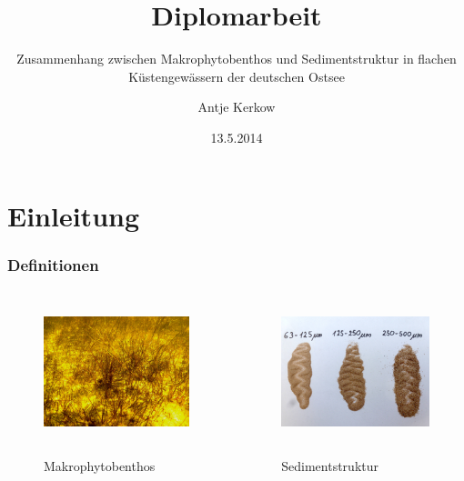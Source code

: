 \documentclass{beamer}
\title{Diplomarbeit}
\subtitle{Zusammenhang zwischen Makrophytobenthos und Sedimentstruktur in flachen Küstengewässern der deutschen Ostsee}
\author{Antje Kerkow}
\institute[Universität Greifswald]{Universität Greifswald, Studiengang Landschaftsökologie und Naturschutz}
\date{13.5.2014}
\begin{document}
\begin{frame}
\titlepage
\end{frame}

\begin{frame}
\tableofcontents
\end{frame}

\section{Einleitung}
\begin{frame}
\frametitle{Definitionen}
\begin{columns}
\begin{column}{5.5cm}
\begin{figure}
\includegraphics[height=40mm]{images/Fotos/makrophytobenthos.jpg}

Makrophytobenthos
\end{figure}
\end{column}
\begin{column}{5.5cm}
\begin{figure}
\includegraphics[height=40mm]{images/Fotos/korngroessen.jpg}

Sedimentstruktur
\end{figure}
\end{column}
\end{columns}
\end{frame}
\end{document}
